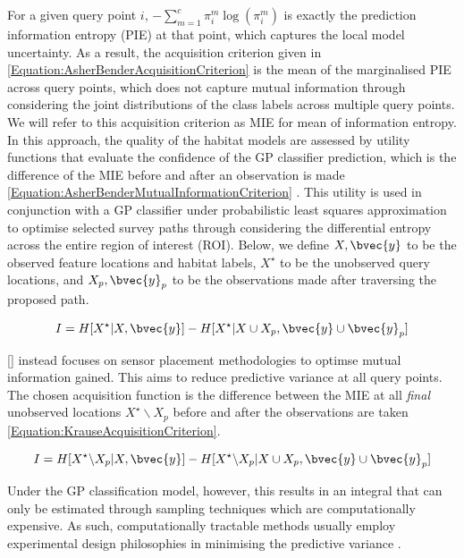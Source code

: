 \documentclass{article}
\newcommand{\incite}[1]{\citeauthor{#1} [\citeyear{#1}]}
\begin{document}
	For a given query point $i$, $- \sum_{m = 1}^{c} \pi^{m}_{i} \log(\pi^{m}_{i})$ is exactly the prediction information entropy (PIE) at that point, which captures the local model uncertainty. As a result, the acquisition criterion given in \eqref{Equation:AsherBenderAcquisitionCriterion} is the mean of the marginalised PIE across query points, which does not capture mutual information through considering the joint distributions of the class labels across multiple query points. We will refer to this acquisition criterion as MIE for mean of information entropy. In this approach, the quality of the habitat models are assessed by utility functions that evaluate the confidence of the GP classifier prediction, which is the difference of the MIE before and after an observation is made \eqref{Equation:AsherBenderMutualInformationCriterion} \cite{Rigby:ROB20372}. This utility is used in conjunction with a GP classifier under probabilistic least squares approximation to optimise selected survey paths through considering the differential entropy across the entire region of interest (ROI). Below, we define $X, \bvec{y}$ to be the observed feature locations and habitat labels, $X^{\star}$ to be the unobserved query locations, and $X_{p}, \bvec{y}_{p}$ to be the observations made after traversing the proposed path.

	\begin{equation}
		I = H[X^{\star} | X, \bvec{y}] - H[X^{\star} | X \cup X_{p}, \bvec{y} \cup \bvec{y}_{p}]
	\label{Equation:AsherBenderMutualInformationCriterion}
	\end{equation}
	
	\incite{Krause:2008:NSP:1390681.1390689} instead focuses on sensor placement methodologies to optimse mutual information gained. This aims to reduce predictive variance at all query points. The chosen acquisition function is the difference between the MIE at all \textit{final} unobserved locations $X^{\star} \backslash X_{p}$ before and after the observations are taken \eqref{Equation:KrauseAcquisitionCriterion}.
	
	\begin{equation}
		I = H[X^{\star} \backslash X_{p} | X, \bvec{y}] - H[X^{\star} \backslash X_{p} | X \cup X_{p}, \bvec{y} \cup \bvec{y}_{p}]
	\label{Equation:KrauseAcquisitionCriterion}
	\end{equation}
	
	Under the GP classification model, however, this results in an integral that can only be estimated through sampling techniques which are computationally expensive. As such, computationally tractable methods usually employ experimental design philosophies in minimising the predictive variance \cite{AsherBender}.
	
\end{document}
